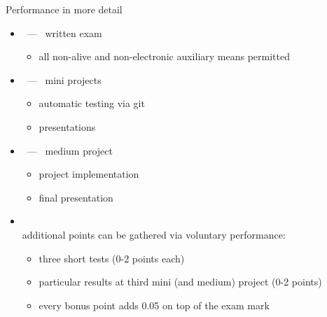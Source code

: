 \begin{frame}[c]{Performance in more detail}
  \begin{itemize}
  \item<1->  \ --- \ \alert{written exam}
    \begin{itemize}
    \item all non-alive and non-electronic auxiliary means permitted
    \end{itemize}
    \medskip
  \item<1->  \ --- \ \alert{mini projects}
    \begin{itemize}
    \item automatic testing via git
    \item presentations
    \end{itemize}
    \medskip
  \item<2->  \ --- \ \alert{medium project}
    \begin{itemize}
    \item project implementation
    \item final presentation
    \end{itemize}
    \medskip
  \item<3-> \\\small
    additional points can be gathered via voluntary performance:
    \begin{itemize}
    \item three short tests  (0-2 points each)
    \item particular results at third mini (and medium) project (0-2 points)
    \item every bonus point adds 0.05 on top of the exam mark
    \end{itemize}
  \end{itemize}
\end{frame}
%
